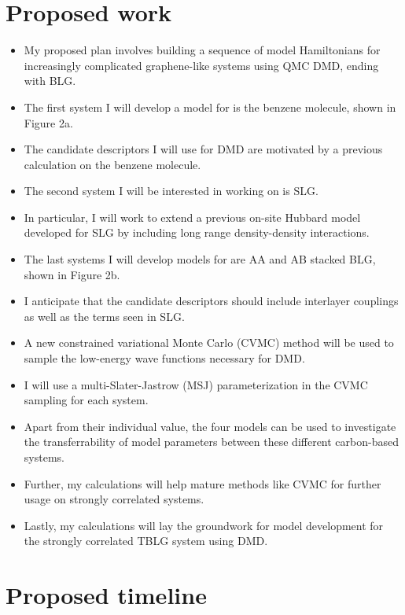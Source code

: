 \documentclass{article}
\begin{document}
\section{Proposed work}
\begin{itemize}
\item My proposed plan involves building a sequence of model Hamiltonians for increasingly complicated graphene-like systems using QMC DMD, ending with BLG.

\item The first system I will develop a model for is the benzene molecule, shown in Figure 2a.

\item The candidate descriptors I will use for DMD are motivated by a previous calculation on the benzene molecule.

\item The second system I will be interested in working on is SLG.

\item In particular, I will work to extend a previous on-site Hubbard model developed for SLG by including long range density-density interactions.

\item The last systems I will develop models for are AA and AB stacked BLG, shown in Figure 2b.

\item I anticipate that the candidate descriptors should include interlayer couplings as well as the terms seen in SLG.

\item A new constrained variational Monte Carlo (CVMC) method will be used to sample the low-energy wave functions necessary for DMD.

\item I will use a multi-Slater-Jastrow (MSJ) parameterization in the CVMC sampling for each system.

\item Apart from their individual value, the four models can be used to investigate the transferrability of model parameters between these different carbon-based systems.

\item Further, my calculations will help mature methods like CVMC for further usage on strongly correlated systems.

\item Lastly, my calculations will lay the groundwork for model development for the strongly correlated TBLG system using DMD.
\end{itemize}
\section{Proposed timeline}
\end{document}
